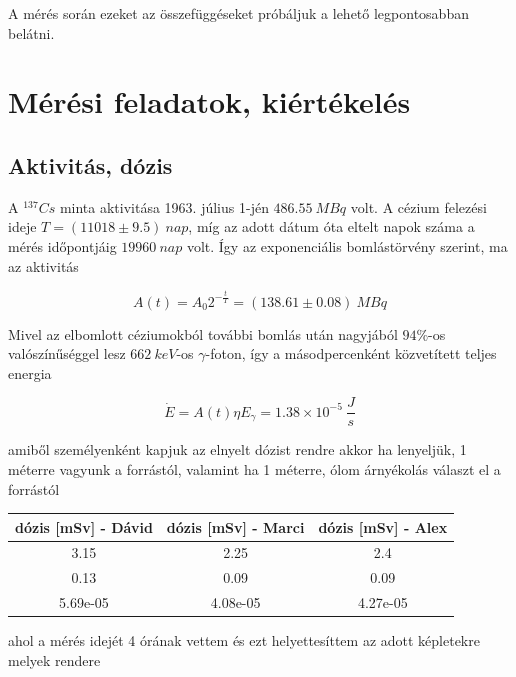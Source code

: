 \documentclass[a4paper,12pt]{article}
\begin{document}
\par A mérés során ezeket az összefüggéseket próbáljuk a lehető legpontosabban belátni.

\section{Mérési feladatok, kiértékelés}

\subsection{Aktivitás, dózis}

\par A $^{137}Cs$ minta aktivitása 1963. július 1-jén $486.55~MBq$ volt. A cézium felezési ideje $T = (11018 \pm 9.5)~nap$, míg az adott dátum óta eltelt napok száma a mérés időpontjáig $19 960~nap$ volt. Így az exponenciális bomlástörvény szerint, ma az aktivitás

\begin{equation*}
	A(t) = A_{0}2^{-\frac{t}{T}} = (138.61 \pm 0.08)~MBq
\end{equation*}

\par Mivel az elbomlott céziumokból további bomlás után nagyjából $94\%$-os valószínűséggel lesz $662~keV$-os $\gamma$-foton, így a másodpercenként közvetített teljes energia

\begin{equation*}
	\dot{E} = A(t)\eta E_{\gamma} = 1.38 \times 10^{-5} ~\frac{J}{s} 
\end{equation*}

amiből személyenként kapjuk az elnyelt dózist rendre akkor ha lenyeljük, 1 méterre vagyunk a forrástól, valamint ha 1 méterre, ólom árnyékolás választ el a forrástól

\begin{center}
\begin{tabular}{|c|c|c|}
\hline
dózis [mSv] - Dávid & dózis [mSv] - Marci & dózis [mSv] - Alex \\
\hline
3.15 & 2.25 & 2.4 \\
\hline
0.13 & 0.09 & 0.09 \\
\hline
5.69e-05 & 4.08e-05 & 4.27e-05 \\
\hline
\end{tabular}
\end{center}

ahol a mérés idejét 4 órának vettem és ezt helyettesíttem az adott képletekre melyek rendere
\end{document}
